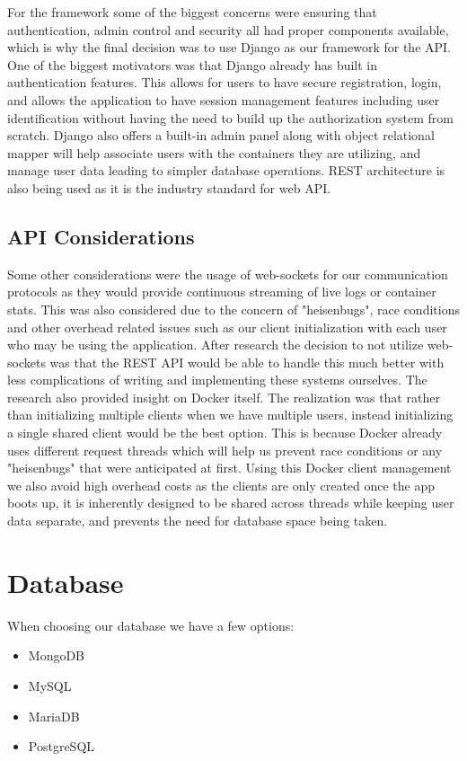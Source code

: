 \documentclass[12pt]{article}
\begin{document}
For the framework some of the biggest concerns were ensuring that authentication, admin control and security all had proper components available, which is why the final decision was to use Django as our framework for the API. One of the biggest motivators was that Django already has built in authentication features. This allows for users to have secure registration, login, and allows the application to have session management features including user identification without having the need to build up the authorization system from scratch. Django also offers a built-in admin panel along with object relational mapper will help associate users with the containers they are utilizing, and manage user data leading to simpler database operations. REST architecture is also being used as it is the industry standard for web API.

\subsection{API Considerations} \label{subsec:api-considerations}
Some other considerations were the usage of web-sockets for our communication protocols as they would provide continuous streaming of live logs or container stats. This was also considered due to the concern of "heisenbugs", race conditions and other overhead related issues such as our client initialization with each user who may be using the application. After research the decision to not utilize web-sockets was that the REST API would be able to handle this much better with less complications of writing and implementing these systems ourselves. The research also provided insight on Docker itself. The realization was that rather than initializing multiple clients when we have multiple users, instead initializing a single shared client would be the best option. This is because Docker already uses different request threads which will help us prevent race conditions or any "heisenbugs" that were anticipated at first. Using this Docker client management we also avoid high overhead costs as the clients are only created once the app boots up, it is inherently designed to be shared across threads while keeping user data separate, and prevents the need for database space being taken.

\section{Database}
When choosing our database we have a few options:
\begin{itemize}
	\item MongoDB
	\item MySQL
	\item MariaDB
	\item PostgreSQL
\end{itemize}
\end{document}
